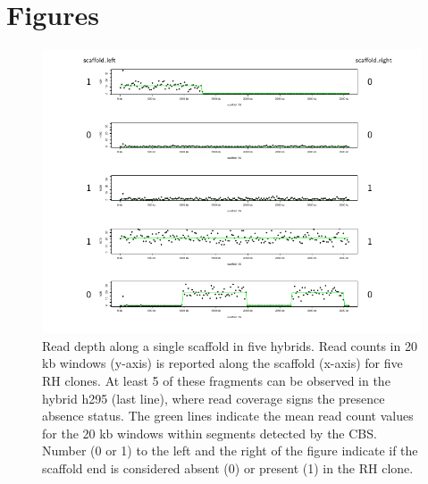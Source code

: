 \documentclass[10pt,letterpaper]{article}
\begin{document}
\section*{Figures}
  \begin{figure}[h!]
  \includegraphics[scale=0.8]{figure1_readcounts_calling.pdf}
  \caption{
 Read depth along a single scaffold in five hybrids. Read counts in 20 kb windows (y-axis) is reported along the scaffold (x-axis) for five RH clones. At least 5 of these fragments can be observed in the hybrid h295 (last line), where read coverage signs the presence absence status. The green lines indicate the mean read count values for the 20 kb windows within segments detected by the CBS. Number (0 or 1) to the left and the right of the figure indicate if the scaffold end is considered absent (0) or present (1) in the RH clone.}
\label{fig1}
\end{figure}
\end{document}
